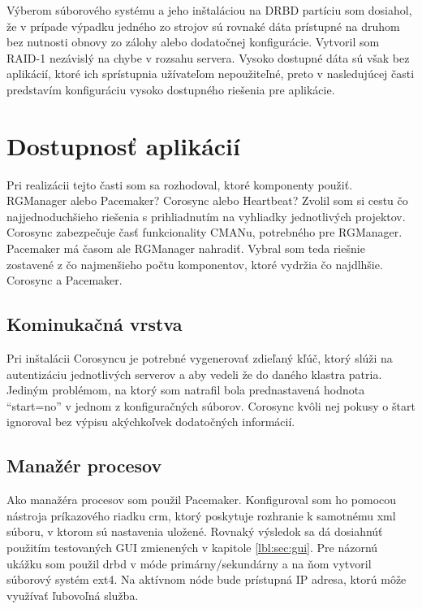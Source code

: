 
Výberom súborového systému a jeho inštaláciou na DRBD partíciu som dosiahol, že v prípade výpadku jedného zo strojov sú rovnaké dáta prístupné na druhom bez nutnosti obnovy zo zálohy alebo dodatočnej konfigurácie. Vytvoril som RAID-1 nezávislý na chybe v rozsahu servera. Vysoko dostupné dáta sú však bez aplikácií, ktoré ich sprístupnia užívateľom nepoužiteľné, preto v nasledujúcej časti predstavím konfiguráciu vysoko dostupného riešenia pre aplikácie.

\section{Dostupnosť aplikácií} %
Pri realizácii tejto časti som sa rozhodoval, ktoré komponenty použiť. RGManager alebo Pacemaker? Corosync alebo Heartbeat? Zvolil som si cestu čo najjednoduchšieho riešenia s prihliadnutím na vyhliadky jednotlivých projektov. Corosync zabezpečuje časť funkcionality CMANu, potrebného pre RGManager. Pacemaker má časom ale RGManager nahradiť. Vybral som teda riešnie zostavené z čo najmenšieho počtu komponentov, ktoré vydržia čo najdlhšie. Corosync a Pacemaker.

\subsection{Kominukačná vrstva}
Pri inštalácii Corosyncu je potrebné vygenerovať zdieľaný kľúč, ktorý slúži na autentizáciu jednotlivých serverov a aby vedeli že do daného klastra patria. Jediným problémom, na ktorý som natrafil bola prednastavená hodnota "`start=no"' v jednom z konfiguračných súborov. Corosync kvôli nej pokusy o štart ignoroval bez výpisu akýchkoľvek dodatočných informácií.

\subsection{Manažér procesov}
Ako manažéra procesov som použil Pacemaker. Konfiguroval som ho pomocou nástroja príkazového riadku crm, ktorý poskytuje rozhranie k samotnému xml súboru, v ktorom sú nastavenia uložené. Rovnaký výsledok sa dá dosiahnúť použitím testovaných GUI zmienených v kapitole \ref{lbl:sec:gui}. Pre názornú ukážku som použil drbd v móde primárny/sekundárny a na ňom vytvoril súborový systém ext4. Na aktívnom nóde bude prístupná IP adresa, ktorú môže využívať ľubovoľná služba.

